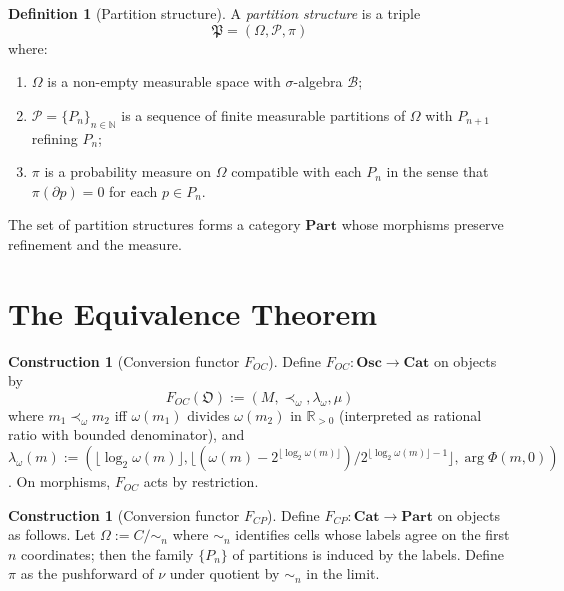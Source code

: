 \documentclass[11pt,a4paper]{article}
\theoremstyle{thmstyle}
\theoremstyle{thmstyle}
\theoremstyle{definition}
\newtheorem{definition}[theorem]{Definition}
\newtheorem{construction}[theorem]{Construction}
\theoremstyle{remark}
\newcommand{\Real}{\mathbb{R}}
\newcommand{\Natural}{\mathbb{N}}
\newcommand{\Osc}{\mathfrak{O}}
\newcommand{\Part}{\mathfrak{P}}
\begin{document}
\begin{definition}[Partition structure]\label{def:part}
A \emph{partition structure} is a triple
\[
\Part = (\Omega, \mathscr{P}, \pi)
\]
where:
\begin{enumerate}[nosep,label=(\roman*)]
\item $\Omega$ is a non-empty measurable space with
      $\sigma$-algebra $\mathscr{B}$;
\item $\mathscr{P} = \{P_{n}\}_{n \in \Natural}$ is
      a sequence of finite measurable partitions of
      $\Omega$ with $P_{n+1}$ refining $P_{n}$;
\item $\pi$ is a probability measure on $\Omega$
      compatible with each $P_{n}$ in the sense that
      $\pi(\partial p) = 0$ for each $p \in P_{n}$.
\end{enumerate}
The set of partition structures forms a category
$\mathbf{Part}$ whose morphisms preserve refinement
and the measure.
\end{definition}

\section{The Equivalence Theorem}
\label{sec:equivalence-theorem}

\begin{construction}[Conversion functor $F_{OC}$]\label{constr:F-OC}
Define $F_{OC} : \mathbf{Osc} \to \mathbf{Cat}$ on
objects by
\[
F_{OC}(\Osc) := (M, \prec_{\omega}, \lambda_{\omega}, \mu)
\]
where $m_{1} \prec_{\omega} m_{2}$ iff $\omega(m_{1})$
divides $\omega(m_{2})$ in $\Real_{>0}$ (interpreted as
rational ratio with bounded denominator), and
$\lambda_{\omega}(m) :=
(\lfloor \log_{2} \omega(m) \rfloor,
 \lfloor (\omega(m) - 2^{\lfloor \log_{2} \omega(m) \rfloor})
        / 2^{\lfloor \log_{2} \omega(m) \rfloor - 1} \rfloor,
 \arg \Phi(m, 0))$.
On morphisms, $F_{OC}$ acts by restriction.
\end{construction}

\begin{construction}[Conversion functor $F_{CP}$]\label{constr:F-CP}
Define $F_{CP} : \mathbf{Cat} \to \mathbf{Part}$ on
objects as follows.  Let $\Omega := C / \sim_{n}$ where
$\sim_{n}$ identifies cells whose labels agree on the
first $n$ coordinates; then the family $\{P_{n}\}$ of
partitions is induced by the labels.  Define
$\pi$ as the pushforward of $\nu$ under quotient by
$\sim_{n}$ in the limit.
\end{construction}
\end{document}
